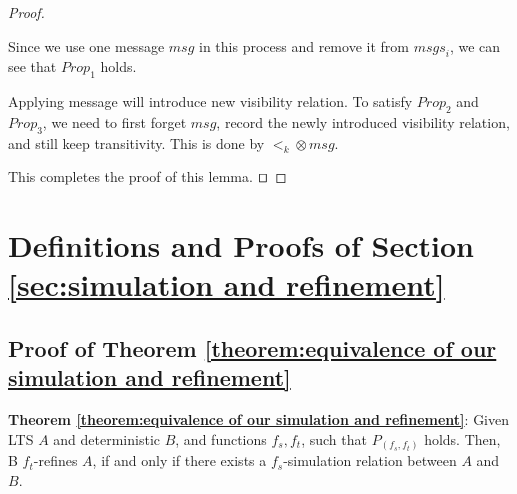 \begin {proof}
\begin{itemize}
\begin{itemize}
        Since we use one message $\mathit{msg}$ in this process and remove it from $\mathit{msgs}_i$, we can see that $\mathit{Prop}_1$ holds.

        Applying message will introduce new visibility relation. To satisfy $\mathit{Prop}_2$ and $\mathit{Prop}_3$, we need to first forget $\mathit{msg}$, record the newly introduced visibility relation, and still keep transitivity. This is done by $<_k \otimes \mathit{msg}$.
    \end{itemize}
\end{itemize}

This completes the proof of this lemma. $\qed$
\end {proof}
















\section{Definitions and Proofs of Section \ref{sec:simulation and refinement}}
\label{sec:appendix definitions and proofs of section simulation and refinement}




\subsection{Proof of Theorem \ref{theorem:equivalence of our simulation and refinement}}
\label{subsec:proof of theorem equivalence of our simulation and refinement}


{\noindent \bf Theorem \ref{theorem:equivalence of our simulation and refinement}}: Given LTS $A$ and deterministic $B$, and functions $f_s,f_t$, such that $P_{(f_s,f_t)}$ holds. Then, B $f_t$-refines $A$, if and only if there exists a $f_s$-simulation relation between $A$ and $B$.

